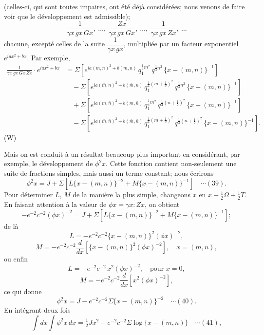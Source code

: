 \documentclass[12pt,a4paper]{article}
\begin{document}
(celles-ci, qui sont toutes impaires, ont \'et\'e d\'ej\`a consid\'er\'ees; nous venons de faire voir que le d\'eveloppement est admissible);
\[
\frac{1}{\gamma x\, gx\, Gx},\ \dots,\ \frac{Zx}{\gamma x\, gx\, Gx},\ \dots,\ \frac{1}{\gamma x\, gx\, Zx},\ \dots
\]
chacune, except\'e celles de la suite $\dfrac{1}{\gamma x\, gx}$, multipli\'ee par un facteur exponentiel $e^{iax^2 + bx}$. Par exemple,
\begin{align*}
\frac{1}{\gamma x\, gx\, Gx\, Zx}\cdot e^{iax^2 + bx}
 &= \Sigma[e^{ia(m,n)^2 + b(m,n)}\, q_1^{\tfrac14 m^2}\, q^{\tfrac14 n^2}\, \{x - (m,n)\}^{-1}]\\
 &\quad - \Sigma[e^{ia(\bar m,n)^2 + b(\bar m,n)}\, q_1^{\tfrac14(m+\frac12)^2}\, q^{\tfrac14 n^2}\, \{x - (\bar m,n)\}^{-1}]\\
 &\quad + \Sigma[e^{ia(m,\bar n)^2 + b(m,\bar n)}\, q_1^{\tfrac14 m^2}\, q^{\tfrac14(n+\frac12)^2}\, \{x - (m,\bar n)\}^{-1}]\\
 &\quad - \Sigma[e^{ia(\bar m,\bar n)^2 + b(\bar m,\bar n)}\, q_1^{\tfrac14(m+\frac12)^2}\, q^{\tfrac14(n+\frac12)^2}\, \{x - (\bar m,\bar n)\}^{-1}].
\end{align*}
\hfill (W)

Mais on est conduit \`a un r\'esultat beaucoup plus important en consid\'erant, par exemple, le d\'eveloppement de $\phi^2 x$. Cette fonction contient non-seulement une suite de fractions simples, mais aussi un terme constant; nous \'ecrirons
\[
\phi^2 x = J + \Sigma[L\{x - (m,n)\}^{-2} + M\{x - (m,n)\}^{-1}] \quad\cdots(39).
\]
Pour d\'eterminer $L$, $M$ de la mani\`ere la plus simple, changeons $x$ en $x + \tfrac12\Omega + \tfrac12 T$. En faisant attention \`a la valeur de $\phi x = \gamma x : Zx$, on obtient
\[
-e^{-2}c^{-2}(\phi x)^{-2} = J + \Sigma[L\{x - (m,n)\}^{-2} + M\{x - (m,n)\}^{-1}];
\]
de l\`a
\[
L = -e^{-2}c^{-2}\{x - (m,n)\}^2(\phi x)^{-2},
\]
\[
M = -e^{-2}c^{-2}\frac{d}{dx}[\{x - (m,n)\}^2(\phi x)^{-2}],\quad x = (m,n),
\]
ou enfin
\[
L = -e^{-2}c^{-2}\, x^2(\phi x)^{-2},\quad\text{pour } x = 0,
\]
\[
M = -e^{-2}c^{-2}\frac{d}{dx}[x^2(\phi x)^{-2}],
\]
ce qui donne
\[
\phi^2 x = J - e^{-2}c^{-2}\Sigma\{x - (m,n)\}^{-2} \quad\cdots(40).
\]
En int\'egrant deux fois
\[
\int dx\int \phi^2 x\, dx = \tfrac12 Jx^2 + e^{-2}c^{-2}\Sigma\log\{x - (m,n)\} \quad\cdots(41),
\]

\newpage
\setcounter{page}{179}
\end{document}
